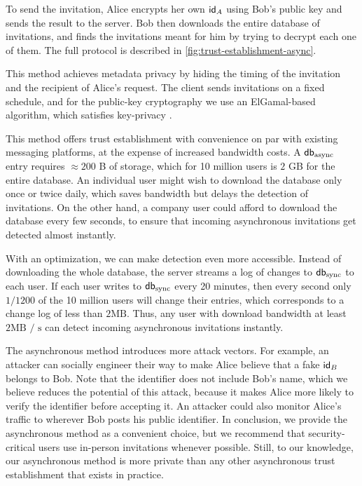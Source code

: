 To send the invitation, Alice encrypts her own $\mathsf{id}_A$ using Bob's public key and sends the result to the server. Bob then downloads the entire database of invitations, and finds the invitations meant for him by trying to decrypt each one of them. The full protocol is described in \cref{fig:trust-establishment-async}.

This method achieves metadata privacy by hiding the timing of the invitation and the recipient of Alice's request. The client sends invitations on a fixed schedule, and for the public-key cryptography we use an ElGamal-based algorithm, which satisfies key-privacy \cite{bellare2001key}.
    
This method offers trust establishment with convenience on par with existing messaging platforms, at the expense of increased bandwidth costs. A $\mathsf{db}_\text{async}$ entry requires $\approx200$ B of storage, which for 10 million users is $2$ GB for the entire database. An individual user might wish to download the database only once or twice daily, which saves bandwidth but delays the detection of invitations. On the other hand, a company user could afford to download the database every few seconds, to ensure that incoming asynchronous invitations get detected almost instantly.

With an optimization, we can make detection even more accessible. Instead of downloading the whole database, the server streams a log of changes to $\mathsf{db}_{\text{sync}}$ to each user. If each user writes to $\mathsf{db}_{\text{sync}}$ every 20 minutes, then every second only $1 / 1200$ of the 10 million users will change their entries, which corresponds to a change log of less than $2 \text{MB}$. Thus, any user with download bandwidth at least $2 \text{MB / s}$ can detect incoming asynchronous invitations instantly.

The asynchronous method introduces more attack vectors. For example, an attacker can socially engineer their way to make Alice believe that a fake $\mathsf{id}_B$ belongs to Bob. Note that the identifier does not include Bob's name, which we believe reduces the potential of this attack, because it makes Alice more likely to verify the identifier before accepting it. An attacker could also monitor Alice's traffic to wherever Bob posts his public identifier. In conclusion, we provide the asynchronous method as a convenient choice, but we recommend that security-critical users use in-person invitations whenever possible. Still, to our knowledge, our asynchronous method is more private than any other asynchronous trust establishment that exists in practice.